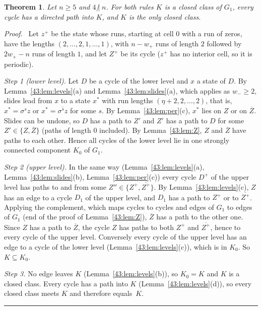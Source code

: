 \documentclass[10pt,a4paper]{article}
\newtheorem{theorem}{Theorem}[section]
\newcommand{\qedmark}{\rule{1.1ex}{1.1ex}}
\newenvironment{proof}[1][Proof]{\par\smallskip\noindent\textit{#1.}\ }{\hfill\qedmark\par\smallskip}
\newcommand{\cpl}[1]{\overline{#1}}           %
\newcommand{\Gone}{G_1}                       %
\newcommand{\ndiv}{\mathrel{\not|}}           %
\begin{document}
\begin{theorem}\label{43:thm:levels}
Let $n\ge 5$ and $4\ndiv n$. For both rules $K$ is a closed class of $\Gone$, every cycle
has a directed path into $K$, and $K$ is the only closed class.
\end{theorem}
\begin{proof}
Let $z^+$ be the state whose runs, starting at cell $0$ with a run of zeros, have the lengths
$(2,\dots,2,1,\dots,1)$, with $n-w_+$ runs of length $2$ followed by $2w_+-n$ runs of length $1$, and let $Z^+$
be its cycle ($z^+$ has no interior cell, so it is periodic).

\emph{Step 1 (lower level).} Let $D$ be a cycle of the lower level and $x$ a state of $D$. By
Lemma~\ref{43:lem:levels}(a) and Lemma~\ref{43:lem:slides}(a), which applies as $w_-\ge 2$, slides lead from $x$
to a state $x^*$ with run lengths $(\eta+2,2,\dots,2)$, that is, $x^*=\sigma^sz$ or $x^*=\cpl{\sigma^sz}$ for
some $s$. By Lemma~\ref{43:lem:per}(c), $x^*$ lies on $Z$ or on $\cpl{Z}$. Slides can be undone, so $D$ has a
path to $Z'$ and $Z'$ has a path to $D$ for some $Z'\in\{Z,\cpl{Z}\}$ (paths of length $0$ included). By
Lemma~\ref{43:lem:Z}, $Z$ and $\cpl{Z}$ have paths to each other. Hence all cycles of the lower level lie in one
strongly connected component $K_0$ of $\Gone$.

\emph{Step 2 (upper level).} In the same way (Lemma~\ref{43:lem:levels}(a), Lemma~\ref{43:lem:slides}(b),
Lemma~\ref{43:lem:per}(c)) every cycle $D^+$ of the upper level has paths to and from some
$Z''\in\{Z^+,\cpl{Z^+}\}$. By Lemma~\ref{43:lem:levels}(c), $Z$ has an edge to a cycle $D_1$ of the upper
level, and $D_1$ has a path to $Z^+$ or to $\cpl{Z^+}$. Applying the complement, which maps cycles to cycles and
edges of $\Gone$ to edges of $\Gone$ (end of the proof of Lemma~\ref{43:lem:Z}), $\cpl{Z}$ has a path to the
other one. Since $Z$ has a path to $\cpl{Z}$, the cycle $Z$ has paths to both $Z^+$ and $\cpl{Z^+}$, hence to
every cycle of the upper level. Conversely every cycle of the upper level has an edge to a cycle of the lower
level (Lemma~\ref{43:lem:levels}(c)), which is in $K_0$. So $K\subseteq K_0$.

\emph{Step 3.} No edge leaves $K$ (Lemma~\ref{43:lem:levels}(b)), so $K_0=K$ and $K$ is a closed class. Every
cycle has a path into $K$ (Lemma~\ref{43:lem:levels}(d)), so every closed class meets $K$ and therefore
equals~$K$.
\end{proof}
\end{document}
